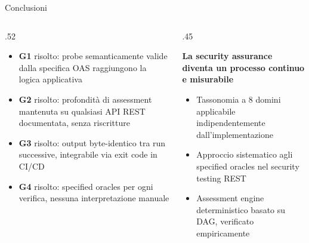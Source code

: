
\begin{frame}{Conclusioni}
  \begin{columns}
    \begin{column}{.52\textwidth}
      \begin{itemize}
        \item \textbf{G1} risolto: probe semanticamente valide dalla specifica OAS \alert{raggiungono la logica applicativa}

        \item \textbf{G2} risolto: profondità di assessment \alert{mantenuta su qualsiasi API REST documentata}, senza riscritture

        \item \textbf{G3} risolto: output byte-identico tra run successive, \alert{integrabile via exit code} in CI/CD

        \item \textbf{G4} risolto: specified oracles per ogni verifica, \alert{nessuna interpretazione manuale}
      \end{itemize}
    \end{column}

    \begin{column}{.45\textwidth}
      \begin{center}
        \textbf{La security assurance diventa un processo \alert{continuo} e \alert{misurabile}}
      \end{center}
      \vspace{0.6em}
      \begin{itemize}
        \item Tassonomia a 8 domini applicabile indipendentemente dall'implementazione
        \item Approccio sistematico agli specified oracles nel security testing REST
        \item Assessment engine deterministico basato su DAG, verificato empiricamente
      \end{itemize}
    \end{column}
  \end{columns}
\end{frame}